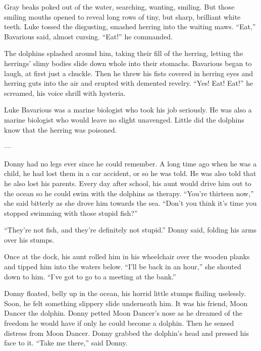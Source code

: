 Gray beaks poked out of the water, searching, wanting, smiling. But
those smiling mouths opened to reveal long rows of tiny, but sharp,
brilliant white teeth. Luke tossed the disgusting, smashed herring
into the waiting maws. ``Eat,'' Bavarious said, almost cursing.
``Eat!'' he commanded.



The dolphins splashed around him, taking their fill of the herring,
letting the herrings' slimy bodies slide down whole into their
stomachs. Bavarious began to laugh, at first just a chuckle. Then
he threw his fists covered in herring eyes and herring guts into
the air and erupted with demented revelry. ``Yes! Eat! Eat!'' he
screamed, his voice shrill with hysteria.



Luke Bavarious was a marine biologist who took his job seriously.
He was also a marine biologist who would leave no slight unavenged.
Little did the dolphins know that the herring was poisoned.



---



Donny had no legs ever since he could remember. A long time ago
when he was a child, he had lost them in a car accident, or so he
was told. He was also told that he also lost his parents. Every day
after school, his aunt would drive him out to the ocean so he could
swim with the dolphins as therapy. ``You're thirteen now,'' she said
bitterly as she drove him towards the sea. ``Don't you think it's
time you stopped swimming with those stupid fish?''



``They're not fish, and they're definitely not stupid.'' Donny said,
folding his arms over his stumps.



Once at the dock, his aunt rolled him in his wheelchair over the
wooden planks and tipped him into the waters below. ``I'll be back
in an hour,'' she shouted down to him. ``I've got to go to a meeting
at the bank.''



Donny floated, belly up in the ocean, his horrid little stumps
flailing uselessly. Soon, he felt something slippery slide
underneath him. It was his friend, Moon Dancer the dolphin. Donny
petted Moon Dancer's nose as he dreamed of the freedom he would
have if only he could become a dolphin. Then he sensed distress
from Moon Dancer. Donny grabbed the dolphin's head and pressed his
face to it. ``Take me there,'' said Donny.



